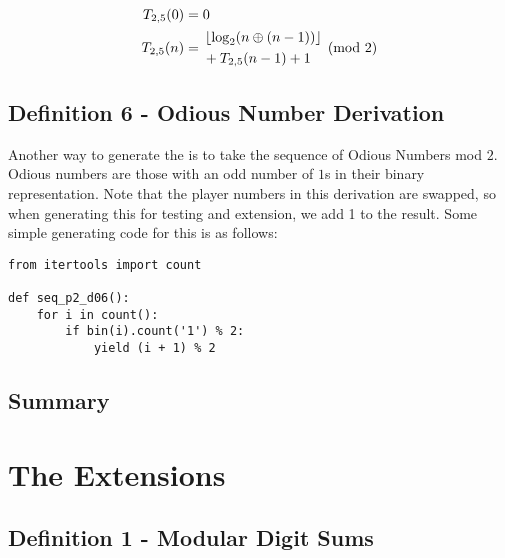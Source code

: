 \documentclass[conference]{IEEEtran}
\begin{document}
\begin{equation}
    \begin{aligned}
        T_{2,5}(0) &= 0 \\
        T_{2,5}(n) &= \begin{aligned}[c]
            &\left\lfloor \log_2(n \oplus (n - 1)) \right\rfloor \\
            &+ T_{2,5}(n - 1) + 1
        \end{aligned} \pmod{2}
    \end{aligned}
\end{equation}

\subsection{Definition 6 - Odious Number Derivation}


Another way to generate the \TMS is to take the sequence of Odious Numbers \cite{OEIS-Odious} mod $2$. Odious numbers are those with an odd number of $1$s in their binary representation. Note that the player numbers in this derivation are swapped, so when generating this for testing and extension, we add 1 to the result. Some simple generating code for this is as follows:

\begin{lstlisting}[style=pythonstyle]
from itertools import count

def seq_p2_d06():
    for i in count():
        if bin(i).count('1') % 2:
            yield (i + 1) % 2
\end{lstlisting}


\subsection{Summary}

\section{The Extensions}

\subsection{Definition 1 - Modular Digit Sums}

\end{document}
